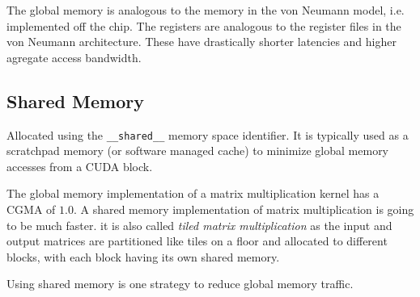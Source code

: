 The global memory is analogous to the memory in the von Neumann model,
 i.e. implemented off the chip. The registers are analogous to the 
 register files in the von Neumann architecture. These have
 drastically shorter latencies and higher agregate access bandwidth.

\subsection*{Shared Memory}
Allocated using the \texttt{\_\_shared\_\_} memory space identifier.
It is typically used as a scratchpad memory (or software managed
cache) to minimize global memory accesses from a CUDA block.

The global memory implementation of a matrix multiplication kernel
has a CGMA of $1.0$. A shared memory implementation of matrix
multiplication is going to be much faster. it is also called
\textit{tiled matrix multiplication} as the input and output
matrices are partitioned like tiles on a floor and allocated to
different blocks, with each block having its own shared memory.

Using shared memory is one strategy to reduce global memory traffic.
